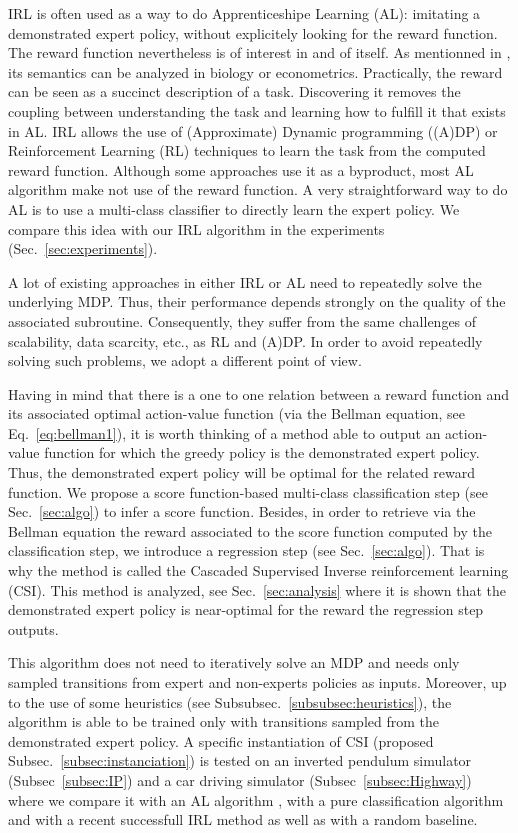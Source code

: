 \documentclass[smallextended]{svjour3}
\begin{document}
IRL is often used as a way to do Apprenticeshipe Learning (AL): imitating a demonstrated expert policy, without explicitely looking for the reward function. The reward function nevertheless is of interest in and of itself. As mentionned in \cite{ng2000algorithms}, its semantics can be analyzed in biology or econometrics. Practically, the reward can be seen as a succinct description of a task. Discovering it removes the coupling between understanding the task and learning how to fulfill it that exists in AL. IRL allows the use of (Approximate) Dynamic programming ((A)DP) or Reinforcement Learning (RL) techniques to learn the task from the computed reward function. Although some approaches use it as a byproduct, most AL algorithm make not use of the reward function. A very straightforward way to do AL is to use a multi-class classifier to directly learn the expert policy. We compare this idea with our IRL algorithm in the experiments (Sec.~\ref{sec:experiments}).

A lot of existing approaches in either IRL or AL need to repeatedly solve the underlying MDP. Thus, their performance depends strongly on the quality of the associated subroutine. Consequently, they suffer from the same challenges of scalability, data scarcity, etc., as RL and (A)DP. In order to avoid repeatedly solving such problems, we adopt a different point of view.

Having in mind that there is a one to one relation between a reward function and its associated optimal action-value function (via the Bellman equation, see Eq.~\ref{eq:bellman1}), it is worth thinking of a method able to output an action-value function for which the greedy policy is the demonstrated expert policy. Thus, the demonstrated expert policy will be optimal for the related reward function. We propose a score function-based multi-class classification step (see Sec.~\ref{sec:algo}) to infer a score function. Besides, in order to retrieve via the Bellman equation the reward associated to the score function computed by the classification step, we introduce a regression step (see Sec.~\ref{sec:algo}). That is why the method is called the Cascaded Supervised Inverse reinforcement learning (CSI). This method is analyzed, see Sec.~\ref{sec:analysis} where it is shown that the demonstrated expert policy is near-optimal for the reward the regression step outputs.

This algorithm does not need to iteratively solve an MDP and needs only sampled transitions from expert and non-experts policies as inputs. Moreover, up to the use of some heuristics (see Subsubsec.~\ref{subsubsec:heuristics}), the algorithm is able to be trained only with transitions sampled from the demonstrated expert policy. A specific instantiation of CSI (proposed Subsec.~\ref{subsec:instanciation}) is tested on an inverted pendulum simulator (Subsec~\ref{subsec:IP}) and a car driving simulator (Subsec~\ref{subsec:Highway}) where we compare it with an AL algorithm \cite{abbeel2004apprenticeship}, with a pure classification algorithm \cite{taskar2005learning} and with a recent successfull IRL method \cite{klein2012scirl} as well as with a random baseline.
\end{document}
